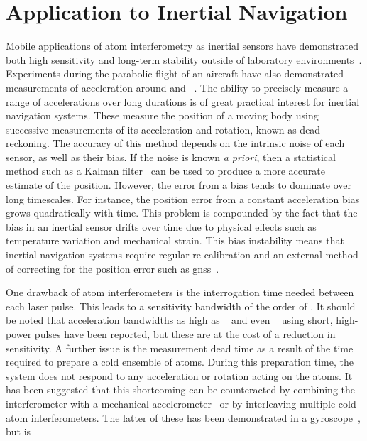 \section{Application to Inertial Navigation}
Mobile applications of atom interferometry as inertial sensors have
demonstrated both high sensitivity and long-term stability outside of
laboratory environments~\cite{Barrett2013}. Experiments during the
parabolic flight of an aircraft have also demonstrated measurements of
acceleration around  and
~\cite{Nyman2006a,Geiger2011a}. 
The ability to precisely measure a range of accelerations over long durations
is of great practical interest for inertial
navigation systems. These measure the position of a
moving body using successive measurements of its acceleration and
rotation, known as dead reckoning. The accuracy of this method depends
on the intrinsic noise of each sensor, as well as their bias. If the
noise is known \textit{a priori}, then a statistical method such as a
Kalman filter~\cite{Faruqi2000} can be used to produce a more accurate estimate of the
position. However, the error from a bias tends to dominate over long
timescales. For instance, the position
error from a constant acceleration bias grows quadratically with time.
This problem is compounded by the fact that the bias in an inertial
sensor drifts over time due to physical effects such as temperature
variation and mechanical strain. This bias instability means that
inertial navigation systems require regular re-calibration and an
external method of correcting for the position error such as
\ac{gnss}~\cite{Wen2016}. 
\par\noindent
One drawback of atom interferometers is the interrogation time needed
between each laser pulse. This leads to a sensitivity bandwidth of the order of
. It should be noted that acceleration bandwidths as
high as 
~\cite{Rakholia2014a} and even
~\cite{Biedermann2017} using short, high-power
pulses
have been reported, but these are at the cost of a reduction in sensitivity.
A further issue is the measurement dead time as a result of the time
required to prepare a cold ensemble of atoms. During this preparation time, the system
does not respond to any acceleration or rotation acting on the atoms.
It has been suggested that this shortcoming can be counteracted by
combining the interferometer with a mechanical accelerometer~\cite{JEKELI2005} or by
interleaving multiple cold atom interferometers. The latter of these
has been demonstrated in a gyroscope~\cite{Dutta2016}, but is
